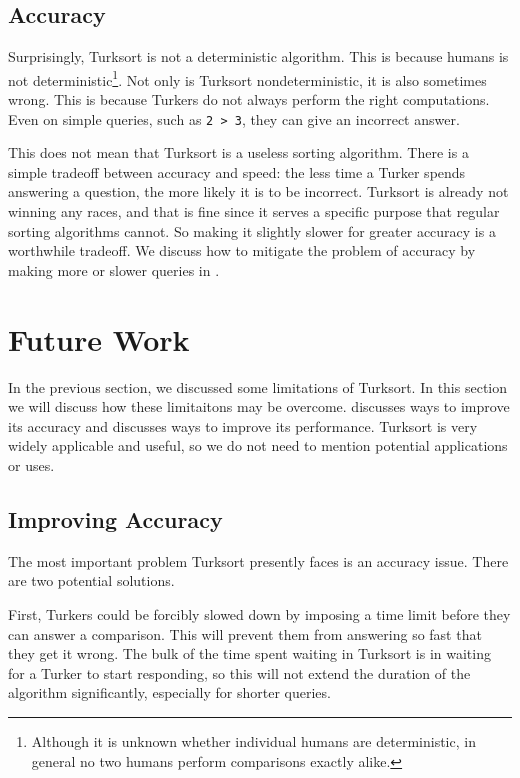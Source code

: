 \documentclass{article}
\begin{document}
\subsection{Accuracy}\label{sec:accuracy}
Surprisingly, Turksort is not a deterministic algorithm. This is because humans
is not deterministic\footnote{Although it is unknown whether individual humans
  are deterministic, in general no two humans perform comparisons exactly
  alike.}. Not only is Turksort nondeterministic, it is also sometimes wrong.
This is because Turkers do not always perform the right computations. Even on
simple queries, such as \texttt{2 > 3}, they can give an incorrect answer.

This does not mean that Turksort is a useless sorting algorithm. There is a
simple tradeoff between accuracy and speed: the less time a Turker spends
answering a question, the more likely it is to be incorrect. Turksort is already
not winning any races, and that is fine since it serves a specific purpose that
regular sorting algorithms cannot. So making it slightly slower for greater
accuracy is a worthwhile tradeoff. We discuss how to mitigate the problem of
accuracy by making more or slower queries in .

\section{Future Work} \label{sec:future-work}
In the previous section, we discussed some limitations of Turksort. In this
section we will discuss how these limitaitons may be overcome.
 discusses ways to improve its accuracy and
 discusses ways to improve its performance.
Turksort is very widely applicable and useful, so we do not need to mention
potential applications or uses.

\subsection{Improving Accuracy}\label{sec:improving-accuracy}

The most important problem Turksort presently faces is an accuracy issue. There
are two potential solutions.

First, Turkers could be forcibly slowed down by imposing a time limit before
they can answer a comparison. This will prevent them from answering so fast that
they get it wrong. The bulk of the time spent waiting in Turksort is in waiting
for a Turker to start responding, so this will not extend the duration of the
algorithm significantly, especially for shorter queries.
\end{document}
